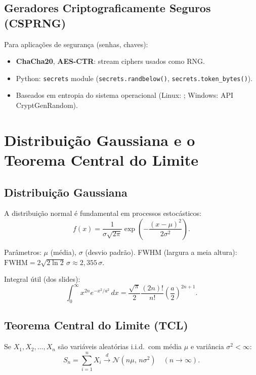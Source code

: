 \documentclass[12pt,a4paper]{article}
\begin{document}
\subsection{Geradores Criptograficamente Seguros (CSPRNG)}

Para aplica\c{c}\~oes de seguran\c{c}a (senhas, chaves):
\begin{itemize}
  \item \textbf{ChaCha20}, \textbf{AES-CTR}: stream ciphers usados como RNG.
  \item Python: \texttt{secrets} module (\texttt{secrets.randbelow()}, \texttt{secrets.token\_bytes()}).
  \item Baseados em entropia do sistema operacional
        (Linux: ; Windows: API CryptGenRandom).
\end{itemize}

\section{Distribui\c{c}\~ao Gaussiana e o Teorema Central do Limite}

\subsection{Distribui\c{c}\~ao Gaussiana}

A distribui\c{c}\~ao normal \'e fundamental em processos estoc\'asticos:
\[
  f(x) = \frac{1}{\sigma\sqrt{2\pi}}\exp\!\left(-\frac{(x-\mu)^2}{2\sigma^2}\right).
\]

Par\^ametros: $\mu$ (m\'edia), $\sigma$ (desvio padr\~ao). FWHM (largura a meia altura): $\text{FWHM} = 2\sqrt{2\ln 2}\,\sigma \approx 2{,}355\,\sigma$.

Integral \'util (dos slides):
\[
  \int_0^\infty x^{2n} e^{-x^2/a^2}\,dx = \frac{\sqrt{\pi}}{2}\frac{(2n)!}{n!}\left(\frac{a}{2}\right)^{2n+1}.
\]

\subsection{Teorema Central do Limite (TCL)}

Se $X_1, X_2, \ldots, X_n$ s\~ao vari\'aveis aleat\'orias i.i.d.\ com m\'edia $\mu$ e vari\^ancia $\sigma^2 < \infty$:
\[
  S_n = \sum_{i=1}^n X_i \xrightarrow{d} \mathcal{N}(n\mu,\, n\sigma^2) \quad (n \to \infty).
\]
\end{document}
